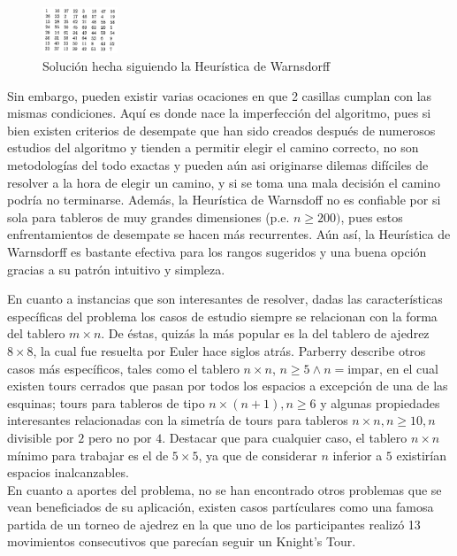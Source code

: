 \documentclass[journal, 10pt]{IEEEtran}
\begin{document}
\begin{figure}[h]
\centering
\includegraphics[width=0.2\textwidth]{figures/warnsdorff.png}
\caption{Soluci\'on hecha siguiendo la Heurística de Warnsdorff}
\label{fig:warnsdorff}
\end{figure}
Sin embargo, pueden existir varias ocaciones en que 2 casillas cumplan con las mismas condiciones. Aquí es donde nace la imperfección del algoritmo, pues si bien existen criterios de desempate que han sido creados después de numerosos estudios del algoritmo y tienden a permitir elegir el camino correcto, no son metodologías del todo exactas y pueden aún asi originarse dilemas difíciles de resolver a la hora de elegir un camino, y si se toma una mala decisión el camino podría no terminarse. Además, la Heurística de Warnsdoff no es confiable por si sola para tableros de muy grandes dimensiones (p.e. $n \geq 200)$, pues estos enfrentamientos de desempate se hacen más recurrentes. Aún así, la Heurística de Warnsdorff es bastante efectiva para los rangos sugeridos y una buena opción gracias a su patrón intuitivo y simpleza.   

En cuanto a instancias que son interesantes de resolver, dadas las características específicas del problema los casos de estudio siempre se relacionan con la forma del tablero $m \times n$. De éstas, quizás la más popular es la del tablero de ajedrez $8 \times 8$, la cual fue resuelta por Euler \cite{Euler:1759} hace siglos atrás. Parberry \cite{Parberry:1997} describe otros casos más específicos, tales como el tablero $n \times n$, $n \ge 5 \wedge n=\text{impar}$, en el cual existen tours cerrados que pasan por todos los espacios a excepción de una de las esquinas; tours para tableros de tipo $n \times (n+1), n \ge 6$ y algunas propiedades interesantes relacionadas con la simetría de tours para tableros $n \times n, n \ge 10, n$ divisible por $2$ pero no por $4$. Destacar que para cualquier caso, el tablero $n \times n$ mínimo para trabajar es el de $5\times 5$, ya que de considerar $n$ inferior a $5$ existirían espacios inalcanzables.\\
En cuanto a aportes del problema, no se han encontrado otros problemas que se vean beneficiados de su aplicación, existen casos partículares como una famosa partida de un torneo de ajedrez en la que uno de los participantes realizó 13 movimientos consecutivos que parecían seguir un Knight's Tour\cite{Shabazz:2010}.
\end{document}
